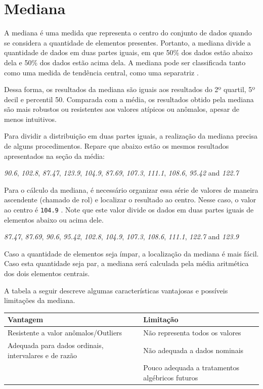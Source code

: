 \documentclass[
]{book}
\begin{document}
\hypertarget{mediana}{%
\section{Mediana}\label{mediana}}

A mediana é uma medida que representa o centro do conjunto de dados quando se considera a quantidade de elementos presentes. Portanto, a mediana divide a quantidade de dados em duas partes iguais, em que 50\% dos dados estão abaixo dela e 50\% dos dados estão acima dela. A mediana pode ser classificada tanto como uma medida de tendência central, como uma separatriz \citep{neto2010}.

Dessa forma, os resultados da mediana são iguais aos resultados do 2º quartil, 5º decil e percentil 50. Comparada com a média, os resultados obtido pela mediana são mais robustos ou resistentes aos valores atípicos ou anômalos, apesar de menos intuitivos.

Para dividir a distribuição em duas partes iguais, a realização da mediana precisa de alguns procedimentos. Repare que abaixo estão os mesmos resultados apresentados na seção da média:

\emph{90.6}, \emph{102.8}, \emph{87.47}, \emph{123.9}, \emph{104.9}, \emph{87.69}, \emph{107.3}, \emph{111.1}, \emph{108.6}, \emph{95.42} and \emph{122.7}

Para o cálculo da mediana, é necessário organizar essa série de valores de maneira ascendente (chamado de rol) e localizar o resultado ao centro. Nesse caso, o valor ao centro é \texttt{104.9} . Note que este valor divide os dados em duas partes iguais de elementos abaixo ou acima dele.

\emph{87.47}, \emph{87.69}, \emph{90.6}, \emph{95.42}, \emph{102.8}, \emph{104.9}, \emph{107.3}, \emph{108.6}, \emph{111.1}, \emph{122.7} and \emph{123.9}

Caso a quantidade de elementos seja ímpar, a localização da mediana é mais fácil. Caso esta quantidade seja par, a mediana será calculada pela média aritmética dos dois elementos centrais.

A tabela a seguir descreve algumas características vantajosas e possíveis limitações da mediana.

\begin{longtable}[]{@{}
  >{\raggedright\arraybackslash}p{}
  >{\raggedright\arraybackslash}p{}@{}}
\toprule
Vantagem & Limitação \\
\midrule
\endhead
Resistente a valor anômalos/Outliers & Não representa todos os valores \\
Adequada para dados ordinais, intervalares e de razão & Não adequada a dados nominais \\
& Pouco adequada a tratamentos algébricos futuros \\
\bottomrule
\end{longtable}
\end{document}
